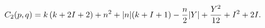 \begin{equation}
C_2(p,q)=k\left(k+2I+2\right) 
+n^2+|n|(k+I+1)-{n\over 2}|Y|+{Y^2\over 12}
+I^2+2I.
\end{equation}


